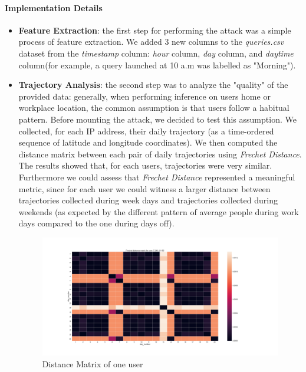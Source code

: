 \documentclass[10pt,conference,compsocconf]{IEEEtran}
\begin{document}
\paragraph{Implementation Details}
\begin{itemize}
    \item \textbf{Feature Extraction}: the first step for performing the attack
    was a simple process of feature extraction. We added 3 new columns to the
    \textit{queries.csv} dataset from the \textit{timestamp} column:
    \textit{hour} column,
    \textit{day} column, and \textit{daytime}
    column(for example, a query launched
    at 10 a.m was labelled as "Morning").
    \item \textbf{Trajectory Analysis}: the second step was to
    analyze the "quality" of the provided data: generally, when performing
    inference on users home or workplace location, the common assumption is that
    users follow a habitual pattern. Before
    mounting the attack, we decided to test this assumption. We collected, for
    each IP address, their daily trajectory (as a time-ordered sequence of
    latitude and longitude coordinates). We then computed the distance matrix
    between each pair of daily trajectories using \textit{Frechet Distance}. The
    results showed that, for each users, trajectories were very similar.
    Furthermore we could assess that \textit{Frechet Distance} represented a
    meaningful metric, since for each user we could witness a larger distance
    between trajectories collected during week days and trajectories collected
    during weekends (as expected by the different pattern of average people
    during work days compared to the one during days off).


    \begin{figure}[h!]
        \centering
        \includegraphics[width=0.9\linewidth]{../privacy_evaluation/daily_trajectories/7.210.121.52-matrix.png}
        \caption{Distance Matrix of one user}
        \label{fig:matrix}
    \end{figure}



\end{itemize}
\end{document}
